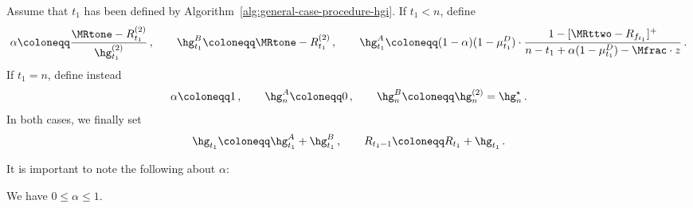 \begin{definition}\label{def:t1-boundary-split}
Assume that $t_1$ has been defined by Algorithm~\ref{alg:general-case-procedure-hgi}.
If $t_1 < n$, define
\begin{equation*}
    \alpha \coloneqq \frac{\MRtone - R_{t_1}^{(2)}}{\hg_{t_1}^{(2)}}\,,
    \qquad
    \hg_{t_1}^B \coloneqq \MRtone - R_{t_1}^{(2)}\,,
    \qquad
    \hg_{t_1}^A \coloneqq
    (1-\alpha)(1-\mu_{t_1}^D)\cdot
    \frac{1-[\MRttwo-R_{f_{t_1}}]^+}
         {n-t_1+\alpha(1-\mu_{t_1}^D)-\Mfrac\cdot z}\,.
\end{equation*}
If $t_1=n$, define instead
\begin{equation*}
    \alpha \coloneqq 1\,,
    \qquad
    \hg_n^A \coloneqq 0\,,
    \qquad
    \hg_n^B \coloneqq \hg_n^{(2)}=\hg_n^\star\,.
\end{equation*}
In both cases, we finally set
\begin{equation*}
    \hg_{t_1} \coloneqq \hg_{t_1}^A+\hg_{t_1}^B\,,
    \qquad
    R_{t_1-1} \coloneqq R_{t_1}+\hg_{t_1}\,.
\end{equation*}
\end{definition}
It is important to note the following about $\alpha$:
\begin{property}
We have $0 \leq \alpha \leq 1$.
\end{property}

